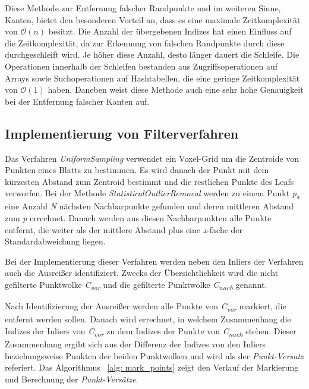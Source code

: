 Diese Methode zur Entfernung falscher Randpunkte und im weiteren Sinne, Kanten, bietet den besonderen Vorteil an, dass es eine maximale Zeitkomplexität von $\mathcal{O}(n)$ besitzt. Die Anzahl der übergebenen Indizes hat einen Einfluss auf die Zeitkomplexität, da zur Erkennung von falschen Randpunkte durch diese durchgeschleift wird. Je höher diese Anzahl, desto länger dauert die Schleife. Die Operationen innerhalb der Schleifen bestanden aus Zugriffsoperationen auf Arrays sowie Suchoperationen auf Hashtabellen, die eine geringe Zeitkomplexität von $\mathcal{O}(1)$ haben. Daneben weist diese Methode auch eine sehr hohe Genauigkeit bei der Entfernung falscher Kanten auf.

\subsection{Implementierung von Filterverfahren}
Das Verfahren \textit{UniformSampling} verwendet ein Voxel-Grid um die Zentroide von Punkten eines Blatts zu bestimmen. Es wird danach der Punkt mit dem kürzesten Abstand zum Zentroid bestimmt und die restlichen Punkte des Leafs verworfen. Bei der Methode \textit{StatisticalOutlierRemoval} werden zu einem Punkt \textit{p\textsubscript{x}} eine Anzahl \textit{N} nächsten Nachbarpunkte gefunden und deren mittleren Abstand zum \textit{p} errechnet. Danach werden aus diesen Nachbarpunkten alle Punkte entfernt, die weiter als der mittlere Abstand plus eine \textit{x}-fache der Standardabweichung liegen. \autocite{rusu_3d_2011}

Bei der Implementierung dieser Verfahren werden neben den Inliers der Verfahren auch die Ausreißer identifiziert. Zwecks der Übersichtlichkeit wird die nicht gefilterte Punktwolke \textit{C\textsubscript{vor}} und die gefilterte Punktwolke \textit{C\textsubscript{nach}} genannt. 

Nach Identifizierung der Ausreißer werden alle Punkte von \textit{C\textsubscript{vor}} markiert, die entfernt werden sollen. Danach wird errechnet, in welchem Zusammenhang die Indizes der Inliers von \textit{C\textsubscript{vor}} zu dem Indizes der Punkte von \textit{C\textsubscript{nach}} stehen. Dieser Zusammenhang ergibt sich aus der Differenz der Indizes von den Inliers beziehungsweise Punkten der beiden Punktwolken und wird als der \textit{Punkt-Versatz} referiert. Das Algorithmus ~\ref{alg: mark_points} zeigt den Verlauf der Markierung und Berechnung der \textit{Punkt-Versätze}. 

